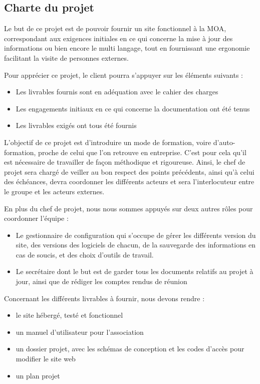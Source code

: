 \documentclass[11pt]{report}
\begin{document}
\subsection{Charte du projet}
Le but de ce projet est de pouvoir fournir un site fonctionnel à la MOA, 
correspondant aux exigences initiales en ce qui concerne la mise à jour des 
informations ou bien encore le multi langage, tout en fournissant une 
ergonomie facilitant la visite de personnes externes.\\

\par Pour apprécier ce projet, le client pourra s'appuyer sur les éléments 
suivants : 
\begin{itemize}
    \item Les livrables fournis sont en adéquation avec le cahier des charges
    \item Les engagements initiaux en ce qui concerne la documentation ont été 
tenus
    \item Les livrables exigés ont tous été fournis\\
\end{itemize}

\par L'objectif de ce projet est d'introduire un mode de formation, voire 
d'auto-formation, proche de celui que l'on retrouve en entreprise. C'est pour 
cela qu'il est nécessaire de travailler de façon méthodique et rigoureuse. 
Ainsi, le chef de projet sera chargé de veiller au bon respect des points 
précédents, ainsi qu'à celui des échéances, devra coordonner les différents 
acteurs et sera l'interlocuteur entre le groupe et les acteurs externes.\\

\par En plus du chef de projet, nous nous sommes appuyés sur deux autres rôles 
pour coordonner l'équipe : 
\begin{itemize}
    \item Le gestionnaire de configuration qui s'occupe de gérer les différents 
version du site, des versions des logiciels de chacun, de la sauvegarde des 
informations en cas de soucis, et des choix d'outils de travail.
    \item Le secrétaire dont le but est de garder tous les documents relatifs 
au projet à jour, ainsi que de rédiger les comptes rendus de réunion\\
\end{itemize}

\par Concernant les différents livrables à fournir, nous devons rendre : 
	\begin{itemize}
	  \item le site hébergé, testé et fonctionnel
	  \item un manuel d'utilisateur pour l’association
	  \item un dossier projet, avec les schémas de conception et les codes d'accès pour modifier le site web
	  \item un plan projet
	\end{itemize}
\end{document}
